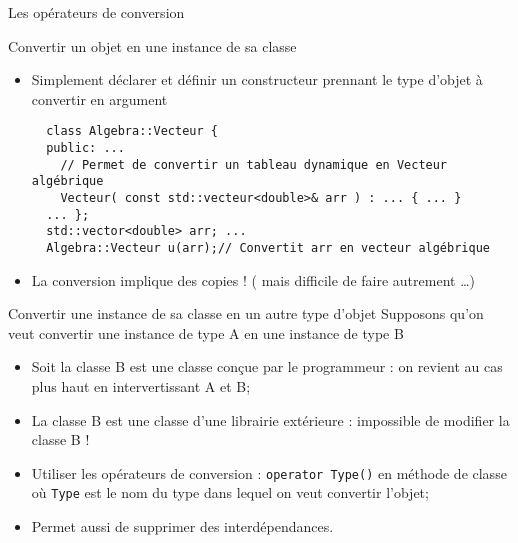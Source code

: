 \documentclass[compress,10pt,aspectratio=169]{beamer}
\begin{document}
  \begin{frame}[fragile]{Les opérateurs de conversion}
    \scriptsize
    \vspace*{-5mm}  
    \begin{block}{\small Convertir un objet en une instance de sa classe}
    \begin{itemize}
    \item Simplement déclarer et définir un constructeur prennant le type d'objet à convertir en argument
    \begin{verbatim}
  class Algebra::Vecteur {
  public: ...
    // Permet de convertir un tableau dynamique en Vecteur algébrique
    Vecteur( const std::vecteur<double>& arr ) : ... { ... }
  ... };      
  std::vector<double> arr; ...
  Algebra::Vecteur u(arr);// Convertit arr en vecteur algébrique
  \end{verbatim}
  \item La conversion implique des copies ! ( mais difficile de faire autrement \ldots )
  \end{itemize}
  \end{block}
  \vspace*{-4mm}
  \begin{block}{\small Convertir une instance de sa classe en un autre type d'objet}
  Supposons qu'on veut convertir une instance de type A en une instance de type B
  \begin{itemize}
  \item Soit la classe B est une classe conçue par le programmeur :  
        on revient au cas plus haut en intervertissant A et B;
  \item La classe B est une classe d'une librairie extérieure : 
        impossible de modifier la classe B !
  \item Utiliser les opérateurs de conversion : \texttt{operator Type()} 
        en méthode de classe où \texttt{Type} est le nom du type dans 
        lequel on veut convertir l'objet;
  \item Permet aussi de supprimer des interdépendances.
  \end{itemize}
  \end{block}
  \end{frame}
  
\end{document}
